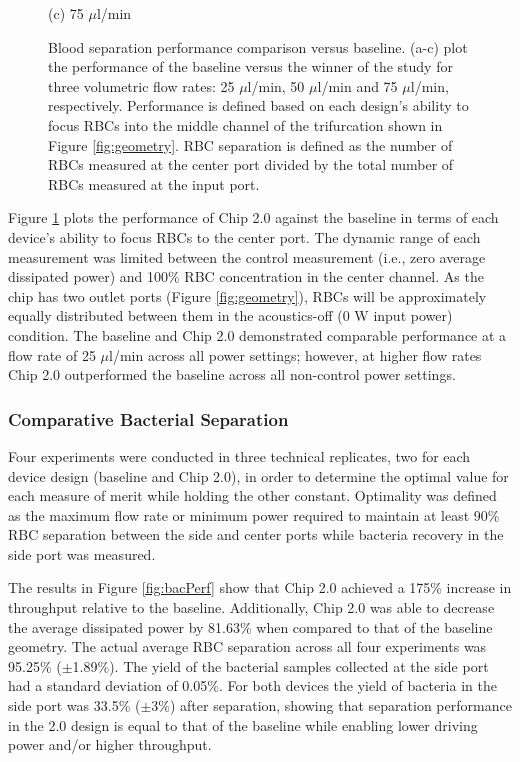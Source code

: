 \begin{figure}[H]
\begin{minipage}[t]{0.99\linewidth}
    \medskip
    \centerline{(c) 75 $\mu$l/min}
  \end{minipage}
  \caption[Separation performance comparison versus baseline]{Blood separation performance comparison versus baseline. (a-c) plot the performance of the baseline versus the winner of the study for three volumetric flow rates: 25 $\mu$l/min, 50 $\mu$l/min and 75 $\mu$l/min, respectively. Performance is defined based on each design's ability to focus RBCs into the middle channel of the trifurcation shown in Figure \ref{fig:geometry}. RBC separation is defined as the number of RBCs measured at the center port divided by the total number of RBCs measured at the input port.}
	\label{fig:headToHeadBlood}
\end{figure}


Figure \ref{fig:headToHeadBlood} plots the performance of Chip 2.0 against the baseline in terms of each device's ability to focus RBCs to the center port. The dynamic range of each measurement was limited between the control measurement (i.e., zero average dissipated power) and 100\% RBC concentration in the center channel. As the chip has two outlet ports (Figure \ref{fig:geometry}), RBCs will be approximately equally distributed between them in the acoustics-off (0 W input power) condition. The baseline and Chip 2.0 demonstrated comparable performance at a flow rate of 25 $\mu$l/min across all power settings; however, at higher flow rates Chip 2.0 outperformed the baseline across all non-control power settings. 



\subsubsection{Comparative Bacterial Separation}
\label{sssec:comparisonBacteria}

Four experiments were conducted in three technical replicates, two for each device design (baseline and Chip 2.0),  in order to determine the optimal value for each measure of merit while holding the other constant. Optimality was defined as the maximum flow rate or minimum power required to maintain at least 90\% RBC separation between the side and center ports while bacteria recovery in the side port was measured. 

The results in Figure \ref{fig:bacPerf} show that Chip 2.0 achieved a 175\% increase in throughput relative to the baseline. Additionally, Chip 2.0 was able to decrease the average dissipated power by 81.63\% when compared to that of the baseline geometry. The actual average RBC separation across all four experiments was 95.25\% ($\pm$1.89\%). The yield of the bacterial samples collected at the side port had a standard deviation of 0.05\%.  For both devices the yield of bacteria in the side port was 33.5\% ($\pm$3\%) after separation, showing that separation performance in the 2.0 design is equal to that of the baseline while enabling lower driving power and/or higher throughput.

